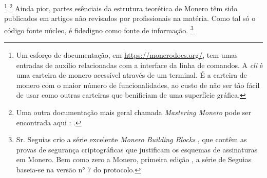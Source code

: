 \footnote{Um esforço de documentação, em \url{https://monerodocs.org/}, tem umas entradas de auxílio relacionadas com a interface da linha de comandos. A {\em cli} é uma carteira de monero acessível através de um terminal. É a carteira de monero com o maior número de funcionalidades, ao custo de não ser tão fácil de usar como outras carteiras que benificiam de uma superfície gráfica.}
\footnote{Uma outra documentação mais geral chamada {\em Mastering Monero} pode ser encontrada aqui : \cite{mastering-monero}.}
Ainda pior, partes esênciais da estrutura teorética de Monero têm sido publicados em artigos não revisados por profissionais na matéria. Como tal só o código fonte núcleo, é fidedigno como fonte de informação.
\footnote{Sr. Seguias crio a série excelente {\em Monero Building Blocks} \cite{monero-building-blocks}, que contêm as provas de segurança criptográficas que justificam os esquemas de assinaturas em Monero. Bem como zero a Monero, primeira edição \cite{ztm-1}, a série de Seguias baseia-se na versão n° 7 do protocolo.}   


